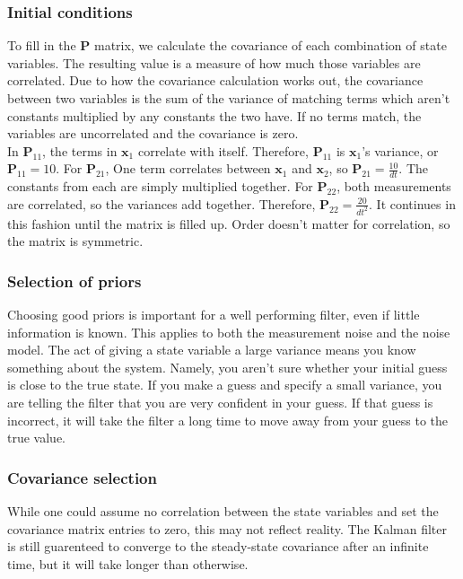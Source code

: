 \documentclass[10pt,conference,compsoc]{IEEEtran}
\newcommand{\mtx}[1] {\bm #1}
\begin{document}
\subsubsection{Initial conditions}

To fill in the $\mtx{P}$ matrix, we calculate the covariance of each combination
of state variables. The resulting value is a measure of how much those variables
are correlated. Due to how the covariance calculation works out, the covariance
between two variables is the sum of the variance of matching terms which aren't
constants multiplied by any constants the two have. If no terms match, the
variables are uncorrelated and the covariance is zero. \\

In $\mtx{P}_{11}$, the terms in $\mtx{x}_1$ correlate with itself. Therefore,
$\mtx{P}_{11}$ is $\mtx{x}_1$'s variance, or $\mtx{P}_{11} = 10$. For
$\mtx{P}_{21}$, One term correlates between $\mtx{x}_1$ and $\mtx{x}_2$, so
$\mtx{P}_{21} = \frac{10}{dt}$. The constants from each are simply multiplied
together. For $\mtx{P}_{22}$, both measurements are correlated, so the variances
add together. Therefore, $\mtx{P}_{22} = \frac{20}{dt^2}$. It continues in this
fashion until the matrix is filled up. Order doesn't matter for correlation, so
the matrix is symmetric. \\

\subsubsection{Selection of priors}

Choosing good priors is important for a well performing filter, even if little
information is known. This applies to both the measurement noise and the noise
model. The act of giving a state variable a large variance means you know
something about the system. Namely, you aren't sure whether your initial guess
is close to the true state. If you make a guess and specify a small variance,
you are telling the filter that you are very confident in your guess. If that
guess is incorrect, it will take the filter a long time to move away from your
guess to the true value.

\subsubsection{Covariance selection}

While one could assume no correlation between the state variables and set the
covariance matrix entries to zero, this may not reflect reality. The Kalman
filter is still guarenteed to converge to the steady-state covariance after an
infinite time, but it will take longer than otherwise.
\end{document}
